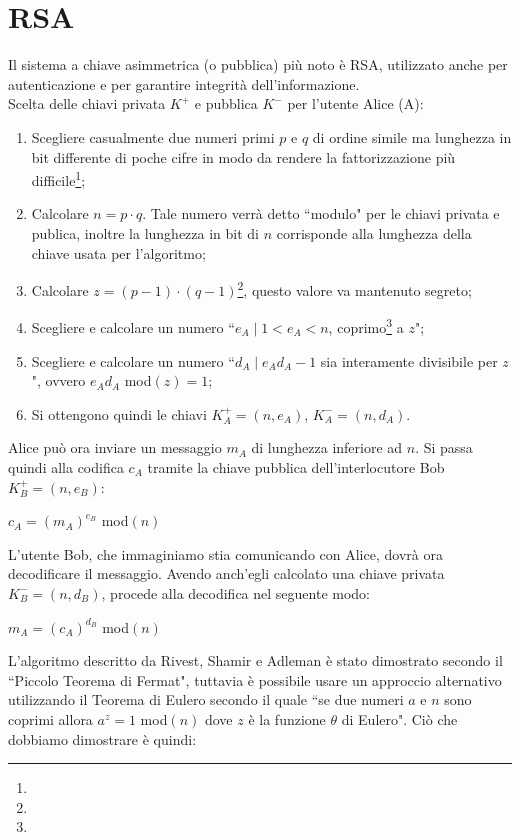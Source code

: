\documentclass[a4paper,12pt]{tesiinfo}
\renewcommand{\footnotesize}{\fontsize{9pt}{11pt}\selectfont}
\begin{document}
\section{RSA}
Il sistema a chiave asimmetrica (o pubblica) pi\`u noto \`e RSA, utilizzato anche per autenticazione e per garantire integrit\`a dell'informazione.
\\
Scelta delle chiavi privata $K^+$ e pubblica $K^-$ per l'utente Alice (A):
\begin{enumerate}
 \item Scegliere casualmente due numeri primi $p$ e $q$ di ordine simile ma lunghezza in bit differente di poche cifre in modo da rendere la fattorizzazione più difficile\footnote{\footnotesize{http://people.csail.mit.edu/rivest/Rsapaper.pdf}};
 \item Calcolare $n=p \cdot q$. Tale numero verr\`a detto ``modulo" per le chiavi privata e publica, inoltre la lunghezza in bit di $n$ corrisponde alla lunghezza della chiave usata per l'algoritmo;
 \item Calcolare $z = (p-1)\cdot (q-1)$\footnote{\footnotesize{La ``z" corrisponde alla funzione $\theta$ di Eulero per la quale sia ha $d \cdot e = 1 $mod$(z)$}}, questo valore va mantenuto segreto;
 \item Scegliere e calcolare un numero ``$e_A \mid 1<e_A<n$, coprimo\footnote{\footnotesize{Con il termine ``coprimo" si intendono due numeri che non abbiano alcun fattore in comune tra loro}} a $z$";
 \item Scegliere e calcolare un numero ``$d_A \mid e_Ad_A-1$ sia interamente divisibile per $z$", ovvero $e_Ad_A$ mod$(z) = 1$;
 \item Si ottengono quindi le chiavi $K_A^+ = (n, e_A)$, $K_A^- = (n, d_A)$.
\end{enumerate}
Alice pu\`o ora inviare un messaggio $m_A$ di lunghezza inferiore ad $n$. Si passa quindi alla codifica $c_A$ tramite la chiave pubblica dell'interlocutore Bob $K_B^+ = (n, e_B)$:
\begin{center}
 $c_A = (m_A)^{e_B}$ mod$(n)$
\end{center}
L'utente Bob, che immaginiamo stia comunicando con Alice, dovr\`a ora decodificare il messaggio. Avendo anch'egli calcolato una chiave privata $K_B^- = (n, d_B)$, procede alla decodifica nel seguente modo:
\begin{center}
 $m_A = (c_A)^{d_B}$ mod$(n)$
\end{center}
L'algoritmo descritto da Rivest, Shamir e Adleman \`e stato dimostrato secondo il ``Piccolo Teorema di Fermat", tuttavia \`e possibile usare un approccio alternativo utilizzando il Teorema di Eulero secondo il quale ``se due numeri $a$ e $n$ sono coprimi allora $a^z = 1$ mod$(n)$ dove $z$ \`e la funzione $\theta$ di Eulero". Ci\`o che dobbiamo dimostrare \`e quindi:
\end{document}
